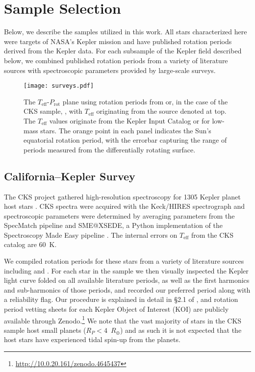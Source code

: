 \documentclass[linenumbers,tighten,trackchanges,twocolumn]{aastex631}
\newcommand{\teff}{\ensuremath{T_{\mathrm{eff}}}\xspace}
\newcommand{\prot}{\ensuremath{P_\mathrm{rot}}\xspace}
\newcommand{\rearth}{$R_\oplus$\xspace}
\begin{document}
\section{Sample Selection} \label{sec:sample}
Below, we describe the samples utilized in this work. All stars characterized here were targets of NASA's Kepler mission \citep{Borucki2010} and have published rotation periods derived from the Kepler data. For each subsample of the Kepler field described below, we combined published rotation periods from a variety of literature sources with spectroscopic parameters provided by large-scale surveys.

\begin{figure*}
    \centering
    \texttt{[image: surveys.pdf]}
    \caption{The \teff-\prot plane using rotation periods from \citet{McQuillan2014} or, in the case of the CKS sample, \citet{McQuillan2013}, with \teff originating from the source denoted at top. The \citet{McQuillan2014} \teff values originate from the Kepler Input Catalog \citep[KIC,][]{Brown2011} or \citet{Dressing2013} for low-mass stars. The orange point in each panel indicates the Sun's equatorial rotation period, with the errorbar capturing the range of periods measured from the differentially rotating surface.}
    \label{fig:surveys}
\end{figure*}

\subsection{California--Kepler Survey} \label{sec:cks}
The CKS project gathered high-resolution spectroscopy for 1305 Kepler planet host stars \citep{Petigura2017}. CKS spectra were acquired with the Keck/HIRES spectrograph \citep{Vogt1994} and spectroscopic parameters were determined by averaging parameters from the SpecMatch pipeline \citep{Petigura2015} and SME@XSEDE, a Python implementation of the Spectroscopy Made Easy pipeline \citep{Valenti1996}. The internal errors on \teff from the CKS catalog are 60~K.

We compiled rotation periods for these stars from a variety of literature sources including \citet{McQuillan2013, Mazeh2015} and \citet{Angus2018}. For each star in the sample we then visually inspected the Kepler light curve folded on all available literature periods, as well as the first harmonics and sub-harmonics of those periods, and recorded our preferred period along with a reliability flag. Our procedure is explained in detail in \S2.1 of \citet{David2021}, and rotation period vetting sheets for each Kepler Object of Interest (KOI) are publicly available through Zenodo.\footnote{\url{http://10.0.20.161/zenodo.4645437}} We note that the vast majority of stars in the CKS sample host small planets ($R_P < 4$~\rearth) and as such it is not expected that the host stars have experienced tidal spin-up from the planets.
\end{document}
